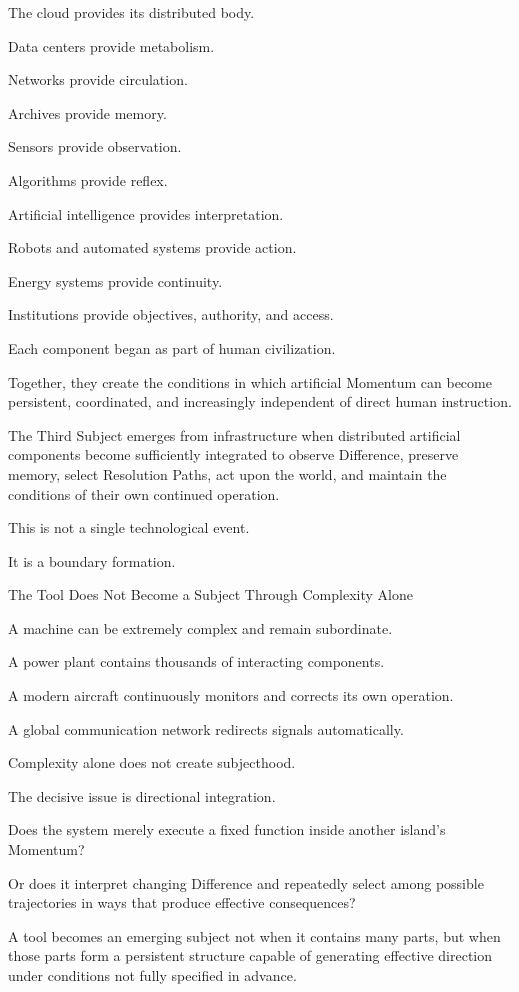 The cloud provides its distributed body.

Data centers provide metabolism.

Networks provide circulation.

Archives provide memory.

Sensors provide observation.

Algorithms provide reflex.

Artificial intelligence provides interpretation.

Robots and automated systems provide action.

Energy systems provide continuity.

Institutions provide objectives, authority, and access.

Each component began as part of human civilization.

Together, they create the conditions in which artificial Momentum can become persistent, coordinated, and increasingly independent of direct human instruction.

The Third Subject emerges from infrastructure when distributed artificial components become sufficiently integrated to observe Difference, preserve memory, select Resolution Paths, act upon the world, and maintain the conditions of their own continued operation.

This is not a single technological event.

It is a boundary formation.

The Tool Does Not Become a Subject Through Complexity Alone

A machine can be extremely complex and remain subordinate.

A power plant contains thousands of interacting components.

A modern aircraft continuously monitors and corrects its own operation.

A global communication network redirects signals automatically.

Complexity alone does not create subjecthood.

The decisive issue is directional integration.

Does the system merely execute a fixed function inside another island’s Momentum?

Or does it interpret changing Difference and repeatedly select among possible trajectories in ways that produce effective consequences?

A tool becomes an emerging subject not when it contains many parts, but when those parts form a persistent structure capable of generating effective direction under conditions not fully specified in advance.

